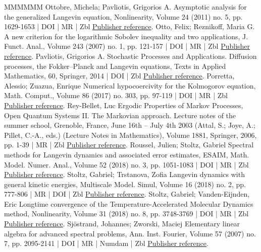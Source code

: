 \begin{thebibliography}{MMMMMM}
 Ottobre, Michela; Pavliotis, Grigorios A. Asymptotic analysis for the generalized Langevin equation, Nonlinearity, Volume 24 (2011) no. 5, pp. 1629-1653 | DOI | MR | Zbl \href{https://ahl.centre-mersenne.org/item/AHL_2022__5__523_0/#OP11}{Publisher reference}.
 Otto, Felix; Reznikoff, Maria G. A new criterion for the logarithmic Sobolev inequality and two applications, J. Funct. Anal., Volume 243 (2007) no. 1, pp. 121-157 | DOI | MR | Zbl \href{https://ahl.centre-mersenne.org/item/AHL_2022__5__523_0/#otto2007}{Publisher reference}.
 Pavliotis, Grigorios A. Stochastic Processes and Applications. Diffusion processes, the Fokker–Planck and Langevin equations, Texts in Applied Mathematics, 60, Springer, 2014 | DOI | Zbl \href{https://ahl.centre-mersenne.org/item/AHL_2022__5__523_0/#PavliotisBook}{Publisher reference}.
 Porretta, Alessio; Zuazua, Enrique Numerical hypocoercivity for the Kolmogorov equation, Math. Comput., Volume 86 (2017) no. 303, pp. 97-119 | DOI | MR | Zbl \href{https://ahl.centre-mersenne.org/item/AHL_2022__5__523_0/#PZ17}{Publisher reference}.
 Rey-Bellet, Luc Ergodic Properties of Markov Processes, Open Quantum Systems II. The Markovian approach. Lecture notes of the summer school, Grenoble, France, June 16th – July 4th 2003 (Attal, S.; Joye, A.; Pillet, C.-A., eds.) (Lecture Notes in Mathematics), Volume 1881, Springer, 2006, pp. 1-39 | MR | Zbl \href{https://ahl.centre-mersenne.org/item/AHL_2022__5__523_0/#rey-bellet}{Publisher reference}.
 Roussel, Julien; Stoltz, Gabriel Spectral methods for Langevin dynamics and associated error estimates, ESAIM, Math. Model. Numer. Anal., Volume 52 (2018) no. 3, pp. 1051-1083 | DOI | MR | Zbl \href{https://ahl.centre-mersenne.org/item/AHL_2022__5__523_0/#RS18}{Publisher reference}.
 Stoltz, Gabriel; Trstanova, Zofia Langevin dynamics with general kinetic energies, Multiscale Model. Simul, Volume 16 (2018) no. 2, pp. 777-806 | MR | DOI | Zbl \href{https://ahl.centre-mersenne.org/item/AHL_2022__5__523_0/#ST18}{Publisher reference}.
 Stoltz, Gabriel; Vanden-Eijnden, Eric Longtime convergence of the Temperature-Accelerated Molecular Dynamics method, Nonlinearity, Volume 31 (2018) no. 8, pp. 3748-3769 | DOI | MR | Zbl \href{https://ahl.centre-mersenne.org/item/AHL_2022__5__523_0/#SV18}{Publisher reference}.
 Sjöstrand, Johannes; Zworski, Maciej Elementary linear algebra for advanced spectral problems, Ann. Inst. Fourier, Volume 57 (2007) no. 7, pp. 2095-2141 | DOI | MR | Numdam | Zbl \href{https://ahl.centre-mersenne.org/item/AHL_2022__5__523_0/#SZ07}{Publisher reference}.

\end{thebibliography}
